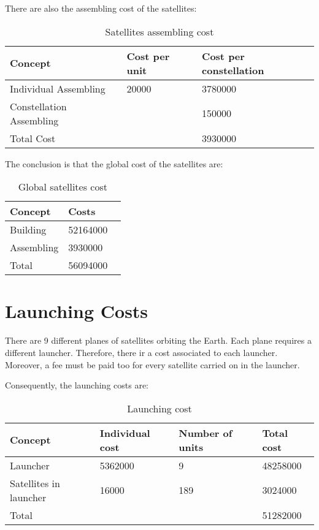There are also the assembling cost of the satellites:

\begin{table}[h]
\begin{center}
\begin{tabular}{ | l | l | l | }
\toprule
\hline
\rowcolor[gray]{0.75}
	Concept & Cost per unit & Cost per constellation \\ \hline
	Individual Assembling & 20000 & 3780000 \\ \hline
	Constellation Assembling &  & 150000 \  \\ \hline
	\rowcolor[gray]{0.65}
	Total Cost &  & 3930000 \  \\ \hline
	\bottomrule
\end{tabular}
\caption{Satellites assembling cost}
\end{center}
\end{table}

The conclusion is that the global cost of the satellites are:

\begin{table}[h]
\begin{center}
\begin{tabular}{ | l | l | }
\toprule
\hline
\rowcolor[gray]{0.75}
	Concept & Costs  \ \\ \hline
	Building & 52164000 \\ \hline
	Assembling & 3930000 \\ \hline
	\rowcolor[gray]{0.65}
	Total & 56094000 \ \\ \hline
	\bottomrule
\end{tabular}
\caption{Global satellites cost}
\end{center}
\end{table}



\section{Launching Costs}
There are 9 different planes of satellites orbiting the Earth. Each plane requires a different launcher. Therefore, there ir a cost associated to each launcher. Moreover, a fee must be paid too for every satellite carried on in the launcher. 

Consequently, the launching costs are:

\begin{table}[h]
\begin{center}
\begin{tabular}{ | l | l | l | l | }
\toprule
\hline
\rowcolor[gray]{0.75}
	Concept & Individual cost & Number of units & Total cost \\ \hline
	Launcher & 5362000 & 9 & 48258000 \\ \hline
	Satellites in launcher & 16000 & 189 & 3024000 \\ \hline
	\rowcolor[gray]{0.65}
	Total &  &  & 51282000 \\ \hline
\end{tabular}
\caption{Launching cost}
\end{center}
\end{table}

